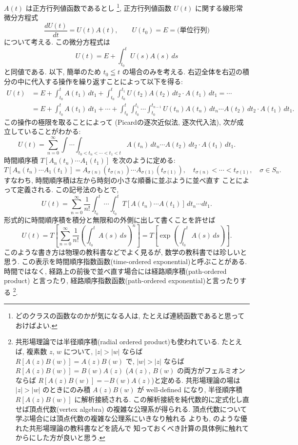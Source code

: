 \documentclass[12pt,twoside]{jarticle}
\theoremstyle{definition} %
\theoremstyle{definition} %
\theoremstyle{definition} %
\numberwithin{theorem}{section}
\numberwithin{equation}{section}
\numberwithin{figure}{section}
\numberwithin{table}{section}
\begin{document}
$A(t)$ は正方行列値函数であるとし%
\footnote{どのクラスの函数なのかが気になる人は, 
たとえば連続函数であると思っておけばよい.},  
正方行列値函数 $U(t)$ に関する線形常微分方程式
\[
 \frac{dU(t)}{dt} = U(t)A(t), \qquad U(t_0)=E=\text{(単位行列)}
\]
について考える. この微分方程式は
\[
 U(t) = E + \int_{t_0}^t U(s)A(s)\,ds
\]
と同値である. 以下, 簡単のため $t_0\leqq t$ の場合のみを考える. 
右辺全体を右辺の積分の中に代入する操作を繰り返すことによって以下を得る:
\begin{align*}
U(t)
&
= E 
+ \int_{t_0}^t A(t_1)\, dt_1
+ \int_{t_0}^t\int_{t_0}^{t_1} U(t_2)A(t_2)\,dt_2\cdot A(t_1)\,dt_1 
= \cdots
\\ &
= E
+ \int_{t_0}^t A(t_1)\, dt_1
+ \cdots
+ \int_{t_0}^t\int_{t_0}^{t_1}\cdots\int_{t_0}^{t_{n-1}}
U(t_n)A(t_n)\,dt_n\cdots A(t_2)\,dt_2\cdot A(t_1)\,dt_1.
\end{align*}
この操作の極限を取ることによって
(Picardの逐次近似法, 逐次代入法), 
次が成立していることがわかる:
\[
U(t) 
= \sum_{n=0}^\infty
\int\!\cdots\!\int_{t_0<t_n<\cdots<t_1<t}
A(t_n)\,dt_n\cdots A(t_2)\,dt_2\cdot A(t_1)\,dt_1.
\]
時間順序積 $T[A_n(t_n)\cdots A_1(t_1)]$ を次のように定める:
\[
T[A_n(t_n)\cdots A_1(t_1)]
=A_{\sigma(n)}(t_{\sigma(n)})\cdots A_{\sigma(1)}(t_{\sigma(1)}), \quad
t_{\sigma(n)}<\cdots<t_{\sigma(1)}, \quad
\sigma\in S_n.
\]
すなわち, 時間順序積は左から時刻の小さな順番に並ぶように並べ直す
ことによって定義される. この記号法のもとで,
\[
U(t)=\sum_{n=0}^\infty
\frac{1}{n!}
\int_{t_0}^t\!\cdots\!\int_{t_0}^t T[A(t_n)\cdots A(t_1)]\,dt_n\cdots dt_1.
\]
形式的に時間順序積を積分と無限和の外側に出して書くことを許せば
\[
U(t)
= T\left[
\sum_{n=0}^\infty \frac{1}{n!} \left(\int_{t_0}^t A(s)\,ds\right)^n
\right]
= T\left[
\exp\left( \int_{t_0}^t A(s)\, ds \right)
\right].
\]
このような書き方は物理の教科書などでよく見るが, 
数学の教科書では珍しいと思う.
この表示を時間順序指数函数(time-ordered exponential)と呼ぶことがある.
時間ではなく, 経路上の前後で並べ直す場合には経路順序積(path-ordered product)
と言ったり, 経路順序指数函数(path-ordered exponential)と言ったりする%
\footnote{共形場理論では半径順序積(radial ordered product)も使われている.
たとえば, 複素数 $z$, $w$ について, 
$|z|>|w|$ ならば $R[A(z)B(w)]=A(z)B(w)$ で,
$|w|>|z|$ ならば $R[A(z)B(w)]=B(w)A(z)$ 
($A(z)$, $B(w)$ の両方がフェルミオンならば $R[A(z)B(w)]=-B(w)A(z)$)と定める.
共形場理論の場は $|z|>|w|$ のときにのみ積 $A(z)B(w)$ が
well-defined になり, 半径順序積 $R[A(z)B(w)]$ に解析接続される.
この解析接続を純代数的に定式化し直せば頂点代数(vertex algebra)
の複雑な公理系が得られる.
頂点代数について学ぶ場合には頂点代数の複雑な公理系にいきなり触れる
よりも, \cite{yamada} のような優れた共形場理論の教科書などを読んで
知っておくべき計算の具体例に触れてからにした方が良いと思う.
}.
\end{document}
